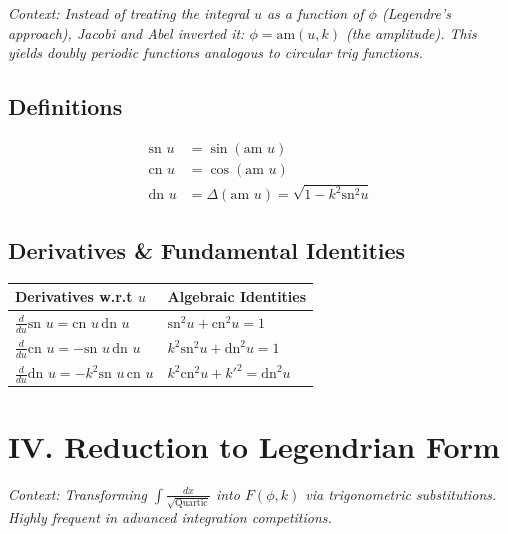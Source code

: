\documentclass[11pt, a4paper]{article}
\begin{document}
\textit{\small Context: Instead of treating the integral $u$ as a function of $\phi$ (Legendre's approach), Jacobi and Abel inverted it: $\phi = \text{am}(u, k)$ (the amplitude). This yields doubly periodic functions analogous to circular trig functions.}

\subsection*{\color{secondary} Definitions}
\begin{align*}
    \text{sn } u &= \sin(\text{am } u) \\
    \text{cn } u &= \cos(\text{am } u) \\
    \text{dn } u &= \Delta(\text{am } u) = \sqrt{1-k^2\text{sn}^2 u}
\end{align*}

\subsection*{\color{secondary} Derivatives \& Fundamental Identities}
\begin{center}
\begin{tabular}{@{}p{} p{}@{}}
\toprule
\textbf{Derivatives w.r.t $u$} & \textbf{Algebraic Identities} \\
\midrule
$\frac{d}{du} \text{sn } u = \text{cn } u \, \text{dn } u$ & $\text{sn}^2 u + \text{cn}^2 u = 1$ \\
$\frac{d}{du} \text{cn } u = -\text{sn } u \, \text{dn } u$ & $k^2 \text{sn}^2 u + \text{dn}^2 u = 1$ \\
$\frac{d}{du} \text{dn } u = -k^2 \text{sn } u \, \text{cn } u$ & $k^2 \text{cn}^2 u + k'^2 = \text{dn}^2 u$ \\
\bottomrule
\end{tabular}
\end{center}


\section*{\color{primary} IV. Reduction to Legendrian Form}

\textit{\small Context: Transforming $\int \frac{dx}{\sqrt{\text{Quartic}}}$ into $F(\phi, k)$ via trigonometric substitutions. Highly frequent in advanced integration competitions.}
\end{document}
